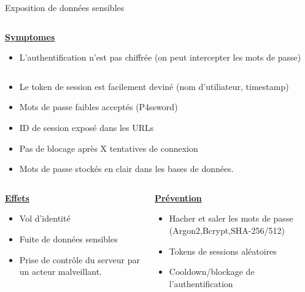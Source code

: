 \documentclass[final,hyperref={pdfpagelabels=false}]{beamer}
\begin{document}
\begin{frame}[t]
\begin{columns}[t]
\begin{column}{.465\textwidth}
\begin{block}{Exposition de données sensibles}
\begin{columns}[T]
		\begin{column}{.875\textwidth}
			\uline{\uline{\textbf{Symptomes}}}
			\begin{itemize}
				\item L'authentification n'est pas chiffrée (on peut intercepter les mots de passe)
			\end{itemize}
		\end{column}
	\end{columns}
	\begin{itemize}
		\item Le token de session est facilement deviné (nom d'utiliateur, timestamp)
		\item Mots de passe faibles acceptés (P4ssword)
		\item ID de session exposé dans les URLs
		\item Pas de blocage après X tentatives de connexion
		\item Mots de passe stockés en clair dans les bases de données.
	\end{itemize}
	\begin{columns}[T]
		\begin{column}{0.5\textwidth}
			\vfill
			\uline{\textbf{Effets}}
			\begin{itemize}
				\item Vol d'identité
				\item Fuite de données sensibles
				\item Prise de contrôle du serveur par un acteur malveillant.
			\end{itemize}
			\vfill
		\end{column}
		\begin{column}{0.5\textwidth}
			\vfill
			\uline{\textbf{Prévention}}
			\begin{itemize}
				\item Hacher et saler les mots de passe (Argon2,Bcrypt,SHA-256/512)
				\item Tokens de sessions aléatoires
				\item Cooldown/blockage de l'authentification
			\end{itemize}
		\end{column}
	\end{columns}



\end{block}



\end{column}
\end{columns}
\end{frame}
\end{document}
